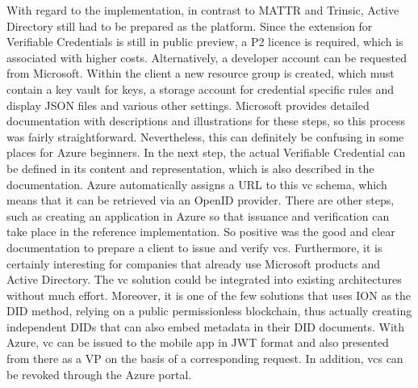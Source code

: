    With regard to the implementation, in contrast to MATTR and Trinsic, Active Directory still had to be prepared as the platform. Since the extension for Verifiable Credentials is still in public preview, a P2 licence is required, which is associated with higher costs. Alternatively, a developer account can be requested from Microsoft. Within the client a new resource group is created, which must contain a key vault for keys, a storage account for credential specific rules and display JSON files and various other settings. Microsoft provides detailed documentation with descriptions and illustrations for these steps, so this process was fairly straightforward. Nevertheless, this can definitely be confusing in some places for Azure beginners. In the next step, the actual Verifiable Credential can be defined in its content and representation, which is also described in the documentation. Azure automatically assigns a URL to this \ac{vc} schema, which means that it can be retrieved via an OpenID provider. There are other steps, such as creating an application in Azure so that issuance and verification can take place in the reference implementation. So positive was the good and clear documentation to prepare a client to issue and verify \acp{vc}. Furthermore, it is certainly interesting for companies that already use Microsoft products and Active Directory. The \ac{vc} solution could be integrated into existing architectures without much effort. Moreover, it is one of the few solutions that uses ION as the \ac{DID} method, relying on a public permissionless blockchain, thus actually creating independent \acp{DID} that can also embed metadata in their \ac{DID} documents. With Azure, \ac{vc} can be issued to the mobile app in JWT format and also presented from there as a \ac{VP} on the basis of a corresponding request. In addition, \acp{vc} can be revoked through the Azure portal.  
    
